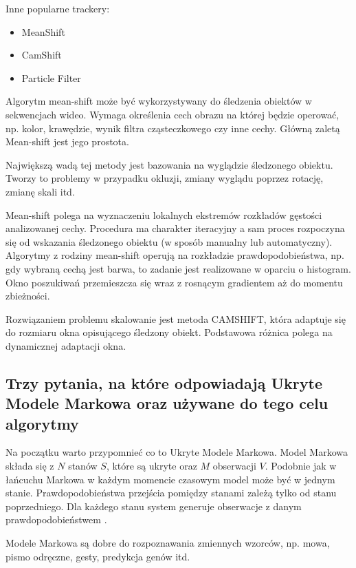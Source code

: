 \documentclass[wi]{zut}
\begin{document}
Inne popularne trackery:

\begin{itemize}
    \item MeanShift
    \item CamShift
    \item Particle Filter
\end{itemize}

Algorytm mean-shift może być wykorzystywany do śledzenia obiektów w sekwencjach wideo. Wymaga określenia cech obrazu na której będzie operować, np. kolor, krawędzie, wynik filtra cząsteczkowego czy inne cechy. Główną zaletą Mean-shift jest jego prostota.

Największą wadą tej metody jest bazowania na wyglądzie śledzonego obiektu. Tworzy to problemy w przypadku okluzji, zmiany wyglądu poprzez rotację, zmianę skali itd.

Mean-shift polega na wyznaczeniu lokalnych ekstremów rozkładów gęstości analizowanej cechy. Procedura ma charakter iteracyjny a sam proces rozpoczyna się od wskazania śledzonego obiektu (w sposób manualny lub automatyczny). Algorytmy z rodziny mean-shift operują na rozkładzie prawdopodobieństwa, np. gdy wybraną cechą jest barwa, to zadanie jest realizowane w oparciu o histogram. Okno poszukiwań przemieszcza się wraz z rosnącym gradientem aż do momentu zbieżności.

Rozwiązaniem problemu skalowanie jest metoda CAMSHIFT, która adaptuje się do rozmiaru okna opisującego śledzony obiekt. Podstawowa różnica polega na dynamicznej adaptacji okna. 

\subsection{Trzy pytania, na które odpowiadają Ukryte Modele Markowa oraz używane do tego celu algorytmy}

Na początku warto przypomnieć co to Ukryte Modele Markowa. Model Markowa składa się z $N$ stanów $S$, które są ukryte oraz $M$ obserwacji $V$. Podobnie jak w łańcuchu Markowa w każdym momencie czasowym model może być w jednym stanie. Prawdopodobieństwa przejścia pomiędzy stanami zależą tylko od stanu poprzedniego. Dla każdego stanu system generuje obserwacje z danym prawdopodobieństwem \cite{Pietrzykowski2020}. 

Modele Markowa są dobre do rozpoznawania zmiennych wzorców, np. mowa, pismo odręczne, gesty, predykcja genów itd.\cite{Pietrzykowski2020}
\end{document}
